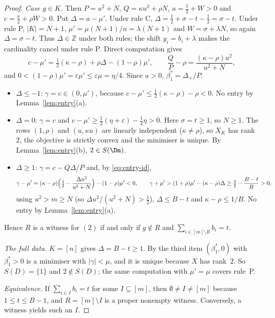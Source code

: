 \begin{proof}
\emph{Case $g\in K$.} Then $P=u^2+N$, $Q=\kappa u^2+\rho N$, $a=\tfrac12+W>0$ and $c=\tfrac{\kappa}{2}+\rho W>0$. Put $\Delta=a-\mu'$. Under rule C, $\Delta=\tfrac12+\sigma-t-\tfrac12=\sigma-t$. Under rule P, $|K|=N+1$, $\mu'=\mu(N+1)/n=\lambda(N+1)$ and $W=\sigma+\lambda N$, so again $\Delta=\sigma-t$. Thus $\Delta\in\mathbb Z$ under both rules; the shift $y_i=b_i+\lambda$ makes the cardinality cancel under rule P. Direct computation gives
\begin{equation}\label{eq:entry-id}
c-\mu'=\tfrac12(\kappa-\rho)+\rho\Delta-(1-\rho)\mu',\qquad \frac{Q}{P}-\rho=\frac{(\kappa-\rho)u^2}{u^2+N},
\end{equation}
and $0<(1-\rho)\mu'=\varepsilon\mu'\le\varepsilon\mu=\eta/4$. Since $a>0$, $\beta_1^\ast=\Delta_+/P$.
\begin{itemize}[leftmargin=2em,itemsep=1pt]
\item $\Delta\le-1$: $\gamma=c\in(0,\mu')$, because $c-\mu'\le\frac12(\kappa-\rho)-\rho<0$. No entry by Lemma~\ref{lem:entry}(a).
\item $\Delta=0$: $\gamma=c$ and $c-\mu'\ge\frac12(\eta+\varepsilon)-\frac14\eta>0$. Here $\sigma=t\ge1$, so $N\ge1$. The rows $(1,\rho)$ and $(u,\kappa u)$ are linearly independent ($\kappa\neq\rho$), so $X_K$ has rank~$2$, the objective is strictly convex and the minimiser is unique. By Lemma~\ref{lem:entry}(b), $2\in S(\Dm)$.
\item $\Delta\ge1$: $\gamma=c-Q\Delta/P$ and, by \eqref{eq:entry-id},
\[
\gamma-\mu'=(\kappa-\rho)\Bigl(\tfrac12-\frac{\Delta u^2}{u^2+N}\Bigr)-(1-\rho)\mu'<0,\qquad
\gamma+\mu'>(1+\rho)\mu'-(\kappa-\rho)\Delta\ge\tfrac32-\frac{B-t}{B}>0 ,
\]
using $u^2>m\ge N$ (so $\Delta u^2/(u^2+N)>\frac12$), $\Delta\le B-t$ and $\kappa-\rho\le1/B$. No entry by Lemma~\ref{lem:entry}(a).
\end{itemize}
Hence $R$ is a witness for $(2)$ if and only if $g\notin R$ and $\sum_{i\in[m]\setminus R}b_i=t$.

\emph{The full data.} $K=[n]$ gives $\Delta=B-t\ge1$. By the third item $(\beta_1^\ast,0)$ with $\beta_1^\ast>0$ is a minimiser with $|\gamma|<\mu$, and it is unique because $X$ has rank~$2$. So $S(D)=\{1\}$ and $2\notin S(D)$; the same computation with $\mu'=\mu$ covers rule~P.

\emph{Equivalence.} If $\sum_{i\in I}b_i=t$ for some $I\subseteq[m]$, then $\emptyset\neq I\neq[m]$ because $1\le t\le B-1$, and $R=[m]\setminus I$ is a proper nonempty witness. Conversely, a witness yields such an $I$.


\end{proof}
